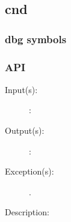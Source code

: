 %
%
%
%
%              

\subsection{cnd}
\label{cnd}

\subsubsection{dbg symbols}

\subsubsection{API}
\begin{description}
\label{cnd_}
\item[{\cfunc[]{cnd\_}{}}: ]
	\begin{description}\item[]
	\item[Input(s): ]
		\begin{description}\item[]
		\item[: ]
		\end{description}
	\item[Output(s): ]
		\begin{description}\item[]
		\item[: ]
		\end{description}
	\item[Exception(s): ]
		\begin{description}\item[]
		\item[.]
		\end{description}
	\item[Description: ]
	\end{description}
\end{description}
